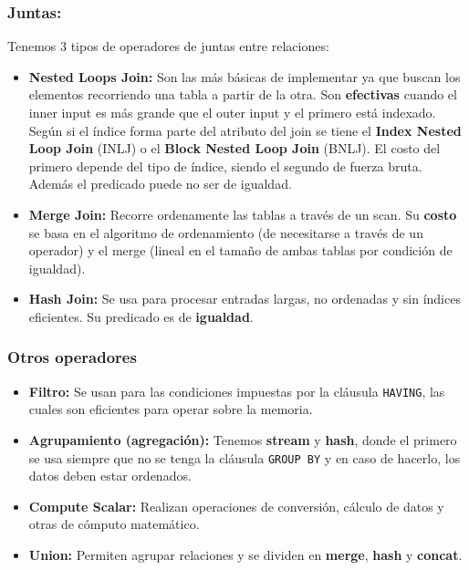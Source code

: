 \subsubsection*{Juntas:}
Tenemos 3 tipos de operadores de juntas entre relaciones:
\begin{itemize}
    \item \textbf{Nested Loops Join:} Son las más básicas de implementar ya que buscan los elementos recorriendo una tabla a partir de la otra. Son \textbf{efectivas} cuando el inner input es más grande que el outer input y el primero está indexado. Según si el índice forma parte del atributo del join se tiene el \textbf{Index Nested Loop Join} (INLJ) o el \textbf{Block Nested Loop Join} (BNLJ). El costo del primero depende del tipo de índice, siendo el segundo de fuerza bruta. Además el predicado puede no ser de igualdad.
    \item \textbf{Merge Join:} Recorre ordenamente las tablas a través de un scan. Su \textbf{costo} se basa en el algoritmo de ordenamiento (de necesitarse a través de un operador) y el merge (lineal en el tamaño de ambas tablas por condición de igualdad).
    \item \textbf{Hash Join:} Se usa para procesar entradas largas, no ordenadas y sin índices eficientes. Su predicado es de \textbf{igualdad}.
\end{itemize}

\subsubsection*{Otros operadores}
\begin{itemize}
    \item \textbf{Filtro:} Se usan para las condiciones impuestas por la cláusula \texttt{HAVING}, las cuales son eficientes para operar sobre la memoria.
    \item \textbf{Agrupamiento (agregación):} Tenemos \textbf{stream} y \textbf{hash}, donde el primero se usa siempre que no se tenga la cláusula \texttt{GROUP BY} y en caso de hacerlo, los datos deben estar ordenados.
    \item \textbf{Compute Scalar:} Realizan operaciones de conversión, cálculo de datos y otras de cómputo matemático.
    \item \textbf{Union:} Permiten agrupar relaciones y se dividen en \textbf{merge}, \textbf{hash} y \textbf{concat}.
\end{itemize}

